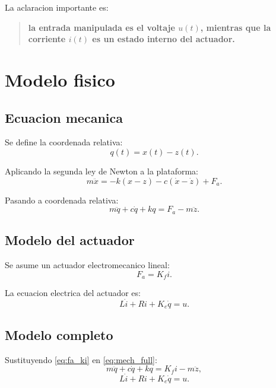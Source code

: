 \documentclass[11pt]{article}
\begin{document}
La aclaracion importante es:
\begin{quote}
\textbf{la entrada manipulada es el voltaje $u(t)$, mientras que la corriente $i(t)$ es un estado interno del actuador.}
\end{quote}

\section{Modelo fisico}

\subsection{Ecuacion mecanica}

Se define la coordenada relativa:
\begin{equation}
q(t)=x(t)-z(t).
\end{equation}

Aplicando la segunda ley de Newton a la plataforma:
\begin{equation}
m\ddot x = -k(x-z)-c(\dot x-\dot z)+F_a.
\end{equation}

Pasando a coordenada relativa:
\begin{equation}
m\ddot q + c\dot q + kq = F_a - m\ddot z.
\label{eq:mech_full}
\end{equation}

\subsection{Modelo del actuador}

Se asume un actuador electromecanico lineal:
\begin{equation}
F_a = K_f i.
\label{eq:fa_ki}
\end{equation}

La ecuacion electrica del actuador es:
\begin{equation}
L\dot i + Ri + K_e\dot q = u.
\label{eq:elec_full}
\end{equation}

\subsection{Modelo completo}

Sustituyendo \eqref{eq:fa_ki} en \eqref{eq:mech_full}:
\begin{equation}
m\ddot q + c\dot q + kq = K_f i - m\ddot z,
\label{eq:full1}
\end{equation}
\begin{equation}
L\dot i + Ri + K_e\dot q = u.
\label{eq:full2}
\end{equation}
\end{document}
